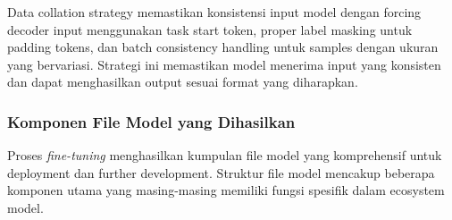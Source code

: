Data collation strategy memastikan konsistensi input model dengan forcing decoder input menggunakan task start token, proper label masking untuk padding tokens, dan batch consistency handling untuk samples dengan ukuran yang bervariasi. Strategi ini memastikan model menerima input yang konsisten dan dapat menghasilkan output sesuai format yang diharapkan.

\subsubsection{Komponen File Model yang Dihasilkan}
\label{subsubsec:komponen-file-model}

Proses \emph{fine-tuning} menghasilkan kumpulan file model yang komprehensif untuk deployment dan further development. Struktur file model mencakup beberapa komponen utama yang masing-masing memiliki fungsi spesifik dalam ecosystem model.

